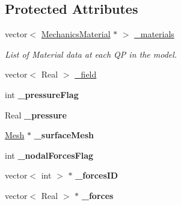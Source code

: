 \subsection*{Protected Attributes}
\begin{DoxyCompactItemize}
\item 
\hypertarget{classvoom_1_1_mechanics_model_abdba86a197a3e053f7fc3d98a4c35e8d}{
vector$<$ \hyperlink{classvoom_1_1_mechanics_material}{MechanicsMaterial} $\ast$ $>$ \hyperlink{classvoom_1_1_mechanics_model_abdba86a197a3e053f7fc3d98a4c35e8d}{\_\-materials}}
\label{classvoom_1_1_mechanics_model_abdba86a197a3e053f7fc3d98a4c35e8d}

\begin{DoxyCompactList}\small\item\em List of Material data at each QP in the model. \item\end{DoxyCompactList}\item 
vector$<$ Real $>$ \hyperlink{classvoom_1_1_mechanics_model_a0c96adf9c1e07f5b604a3db9ffe9b750}{\_\-field}
\item 
\hypertarget{classvoom_1_1_mechanics_model_a29fe651bd66bebc10f448c2a1e0cb255}{
int {\bfseries \_\-pressureFlag}}
\label{classvoom_1_1_mechanics_model_a29fe651bd66bebc10f448c2a1e0cb255}

\item 
\hypertarget{classvoom_1_1_mechanics_model_a9af310f78ef6e9d5903eb9624a55b033}{
Real {\bfseries \_\-pressure}}
\label{classvoom_1_1_mechanics_model_a9af310f78ef6e9d5903eb9624a55b033}

\item 
\hypertarget{classvoom_1_1_mechanics_model_a99688bb2b736b933fcdecc9d5ebe4ba9}{
\hyperlink{classvoom_1_1_mesh}{Mesh} $\ast$ {\bfseries \_\-surfaceMesh}}
\label{classvoom_1_1_mechanics_model_a99688bb2b736b933fcdecc9d5ebe4ba9}

\item 
\hypertarget{classvoom_1_1_mechanics_model_abbd7f67d13e6ae3aedb25e8b87fb4ce3}{
int {\bfseries \_\-nodalForcesFlag}}
\label{classvoom_1_1_mechanics_model_abbd7f67d13e6ae3aedb25e8b87fb4ce3}

\item 
\hypertarget{classvoom_1_1_mechanics_model_a935f58ecabcad603cdce6df9445ecffd}{
vector$<$ int $>$ $\ast$ {\bfseries \_\-forcesID}}
\label{classvoom_1_1_mechanics_model_a935f58ecabcad603cdce6df9445ecffd}

\item 
\hypertarget{classvoom_1_1_mechanics_model_a4ed281e882e7e93ff9f6807e7c8eef11}{
vector$<$ Real $>$ $\ast$ {\bfseries \_\-forces}}
\label{classvoom_1_1_mechanics_model_a4ed281e882e7e93ff9f6807e7c8eef11}


\end{DoxyCompactItemize}
